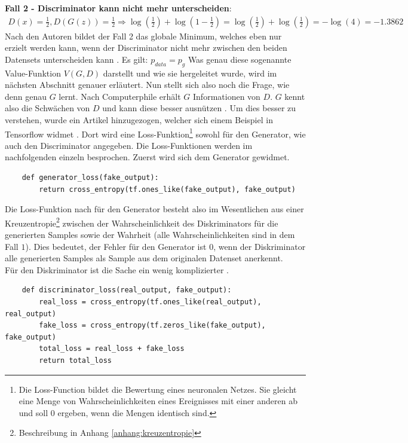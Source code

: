 \textbf{Fall 2 - Discriminator kann nicht mehr unterscheiden}:\\
\begin{align}
    D(x) = \frac{1}{2}, D(G(z)) = \frac{1}{2} \Rightarrow \log(\frac{1}{2}) + \log(1 - \frac{1}{2}) = \log(\frac{1}{2}) + \log(\frac{1}{2}) = -\log(4) = -1.3862
\end{align}
Nach den Autoren bildet der Fall 2 das globale Minimum, welches eben nur erzielt werden kann, wenn der Discriminator nicht mehr zwischen
den beiden Datensets unterscheiden kann \cite[p.~4-5]{8253599}. Es gilt: $p_{data} = p_{g}$
Was genau diese sogenannte Value-Funktion $V(G,D)$ darstellt und wie sie hergeleitet wurde, wird im nächsten Abschnitt
genauer erläutert.
\para
Nun stellt sich also noch die Frage, wie denn genau $G$ lernt. Nach \glqq Computerphile\grqq{} erhält $G$ Informationen von $D$.
$G$ kennt also die Schwächen von $D$ und kann diese besser ausnützen \cite{youtube:gan}. Um dies besser zu verstehen,
wurde ein Artikel hinzugezogen, welcher sich einem Beispiel in Tensorflow widmet \cite{tensorflow:1:gan}. Dort
wird eine Loss-Funktion\footnote{Die Loss-Function bildet die Bewertung eines neuronalen Netzes. Sie gleicht eine Menge von Wahrscheinlichkeiten eines
Ereignisses mit einer anderen ab und soll $0$ ergeben, wenn die Mengen identisch sind.\cite{wiki:lossFunction}}
sowohl für den Generator, wie auch den Discriminator angegeben. Die Loss-Funktionen werden im nachfolgenden einzeln besprochen. Zuerst wird sich dem Generator gewidmet.
\begin{lstlisting}
    def generator_loss(fake_output):
        return cross_entropy(tf.ones_like(fake_output), fake_output)
\end{lstlisting}
Die Loss-Funktion nach \cite{tensorflow:1:gan} für den Generator besteht also im Wesentlichen aus einer Kreuzentropie\footnote{Beschreibung in
Anhang \ref{anhang:kreuzentropie}} zwischen der Wahrscheinlichkeit des Diskriminators für die generierten Samples
sowie der Wahrheit (alle Wahrscheinlichkeiten sind in dem Fall $1$). Dies bedeutet, der Fehler für den Generator ist $0$, wenn der Diskriminator
alle generierten Samples als Sample aus dem originalen Datenset anerkennt.\\
Für den Diskriminator ist die Sache ein wenig komplizierter \cite{tensorflow:1:gan}.
\begin{lstlisting}
    def discriminator_loss(real_output, fake_output):
        real_loss = cross_entropy(tf.ones_like(real_output), real_output)
        fake_loss = cross_entropy(tf.zeros_like(fake_output), fake_output)
        total_loss = real_loss + fake_loss
        return total_loss
\end{lstlisting}
